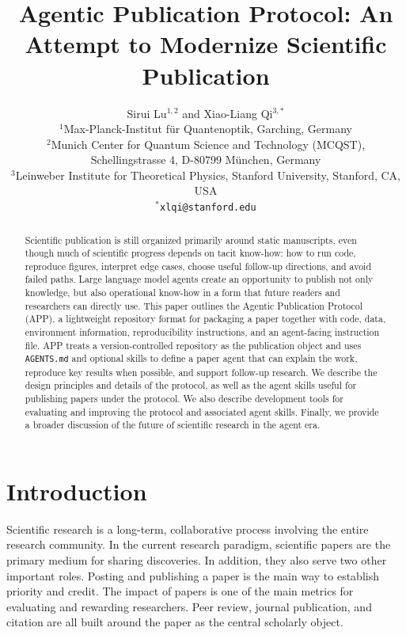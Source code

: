 \documentclass{article}
\title{Agentic Publication Protocol: An Attempt to Modernize Scientific Publication}
\author{
  Sirui Lu$^{1,2}$ and Xiao-Liang Qi$^{3,*}$\\[0.5em]
  $^{1}$Max-Planck-Institut f\"ur Quantenoptik, Garching, Germany\\
  $^{2}$Munich Center for Quantum Science and Technology (MCQST),\\ Schellingstrasse 4, D-80799 M\"unchen, Germany\\
  $^{3}$Leinweber Institute for Theoretical Physics, Stanford University, Stanford, CA, USA\\
  $^{*}$\texttt{xlqi@stanford.edu}
}
\date{}
\begin{document}
\maketitle

\begin{abstract}
    Scientific publication is still organized primarily around static manuscripts,
    even though much of scientific progress depends on tacit know-how: how to run
    code, reproduce figures, interpret edge cases, choose useful follow-up
    directions, and avoid failed paths. Large language model agents create an
    opportunity to publish not only knowledge, but also operational know-how in a
    form that future readers and researchers can directly use. This paper outlines
    the Agentic Publication Protocol (APP), a lightweight repository format for
    packaging a paper together with code, data, environment information,
    reproducibility instructions, and an agent-facing instruction file. APP treats a
    version-controlled repository as the publication object and uses
    \texttt{AGENTS.md} and optional skills to define a paper agent that can explain
    the work, reproduce key results when possible, and support follow-up research.
    We describe the design principles and details of the protocol, as well as the agent skills useful for publishing papers under the protocol. We also describe development tools for evaluating and improving the protocol and associated agent skills. Finally, we provide a broader discussion of the future of scientific research in the agent era. 
\end{abstract}

\section{Introduction}\label{sec: introduction}

Scientific research is a long-term, collaborative process involving the entire research community. In the current research paradigm, scientific papers are the primary medium for sharing discoveries. In addition, they also serve two other important roles. Posting and publishing a paper is the main way to establish priority and credit. The impact of papers is one of the main metrics for evaluating and rewarding researchers. Peer review, journal publication, and citation are all built around the paper as the central scholarly object.
\end{document}
